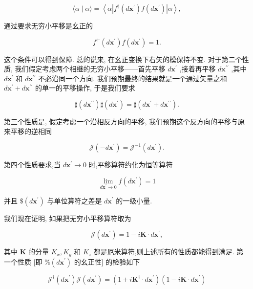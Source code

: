 \documentclass[lang=cn,newtx,10pt,scheme=chinese,thmcnt=section]{elegantbook}
\begin{document}
$$
\langle \alpha \mid \alpha \rangle = \left\langle {\alpha \left| {{f}^{ \dagger }\left( {d{\mathbf{x}}^{\prime }}\right) f\left( {d{\mathbf{x}}^{\prime }}\right) }\right| \alpha }\right\rangle , \tag{1.6.15}
$$

通过要求无穷小平移是幺正的

$$
{f}^{ + }\left( {d{\mathbf{x}}^{\prime }}\right) f\left( {d{\mathbf{x}}^{\prime }}\right) = 1. \tag{1.6.16}
$$

这个条件可以得到保障. 总的说来, 在幺正变换下右矢的模保持不变. 对于第二个性质, 我们假定考虑两个相继的无穷小平移——首先平移 $d{\mathbf{x}}^{\prime }$ ,接着再平移 $d{\mathbf{x}}^{\prime \prime }$ ,其中 $d{\mathbf{x}}^{\prime }$ 和 $d{\mathbf{x}}^{\prime \prime }$ 不必沿同一个方向. 我们预期最终的结果就是一个通过矢量之和 $d{\mathbf{x}}^{\prime } + d{\mathbf{x}}^{\prime \prime }$ 的单一的平移操作, 于是我们要求

$$
\sharp \left( {d{\mathbf{x}}^{\prime \prime }}\right) \sharp \left( {d{\mathbf{x}}^{\prime }}\right) = \sharp \left( {d{\mathbf{x}}^{\prime } + d{\mathbf{x}}^{\prime \prime }}\right) . \tag{1. 6.17}
$$

第三个性质是, 假定考虑一个沿相反方向的平移, 我们预期这个反方向的平移与原来平移的逆相同

$$
\mathcal{J}\left( {-d{\mathbf{x}}^{\prime }}\right) = {\mathcal{J}}^{-1}\left( {d{\mathbf{x}}^{\prime }}\right) . \tag{1.6.18}
$$

第四个性质要求,当 $d{\mathbf{x}}^{\prime } \rightarrow 0$ 时,平移算符约化为恒等算符

$$
\mathop{\lim }\limits_{{d{\mathbf{x}}^{\prime } \rightarrow 0}}f\left( {d{\mathbf{x}}^{\prime }}\right) = 1 \tag{1.6.19}
$$

并且 $\$ \left( {d{\mathbf{x}}^{\prime }}\right)$ 与单位算符之差是 $d{\mathbf{x}}^{\prime }$ 的一级小量.

我们现在证明, 如果把无穷小平移算符取为

$$
\mathcal{J}\left( {d{\mathbf{x}}^{\prime }}\right) = 1 - i\mathbf{K} \cdot d{\mathbf{x}}^{\prime }, \tag{1.6.20}
$$

其中 $\mathbf{K}$ 的分量 ${K}_{x},{K}_{y}$ 和 ${K}_{z}$ 都是厄米算符,则上述所有的性质都能得到满足. 第一个性质 [即 $\% \left( {d{\mathbf{x}}^{\prime }}\right)$ 的幺正性] 的检验如下

$$
{\mathcal{J}}^{ \dagger }\left( {d{\mathbf{x}}^{\prime }}\right) \mathcal{J}\left( {d{\mathbf{x}}^{\prime }}\right) = \left( {1 + i{\mathbf{K}}^{ \dagger } \cdot d{\mathbf{x}}^{\prime }}\right) \left( {1 - i\mathbf{K} \cdot d{\mathbf{x}}^{\prime }}\right)
$$
\end{document}
